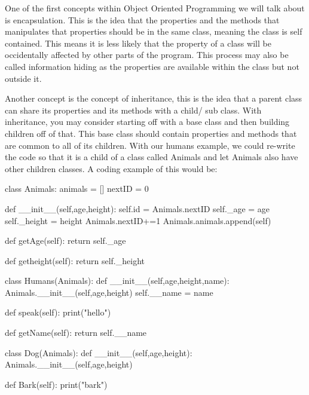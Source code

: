   One of the first concepts within Object Oriented Programming we will talk about is encapsulation. This is the idea that the properties and the methods that manipulates that properties should be in the same class, meaning the class is self contained. This means it is less likely that the property of a class will be occidentally affected by other parts of the program. This process may also be called information hiding as the properties are available within the class but not outside it.
  
  Another concept is the concept of inheritance, this is the idea that a parent class can share its properties and its methods with a child/ sub class. With inheritance, you may consider starting off with a base class and then building children off of that. This base class should contain properties and methods that are common to all of its children. With our humans example, we could re-write the code so that it is a child of a class called Animals and let Animals also have other children classes. A coding example of this would be:
  \begin{python}
class Animals:
	animals = []
	nextID = 0

	def __init__(self,age,height):
		self.id = Animals.nextID
		self._age = age
		self._height = height
		Animals.nextID+=1
		Animals.animals.append(self)

	def getAge(self):
		return self._age

	def getheight(self):
		return self._height

class Humans(Animals):
	def __init__(self,age,height,name):
		Animals.__init__(self,age,height)
		self.__name = name

	def speak(self):
		print("hello")

	def getName(self):
		return self.__name

class Dog(Animals):
	def __init__(self,age,height):
		Animals.__init__(self,age,height)

	def Bark(self):
		print("bark")
  	\end{python}
  	
